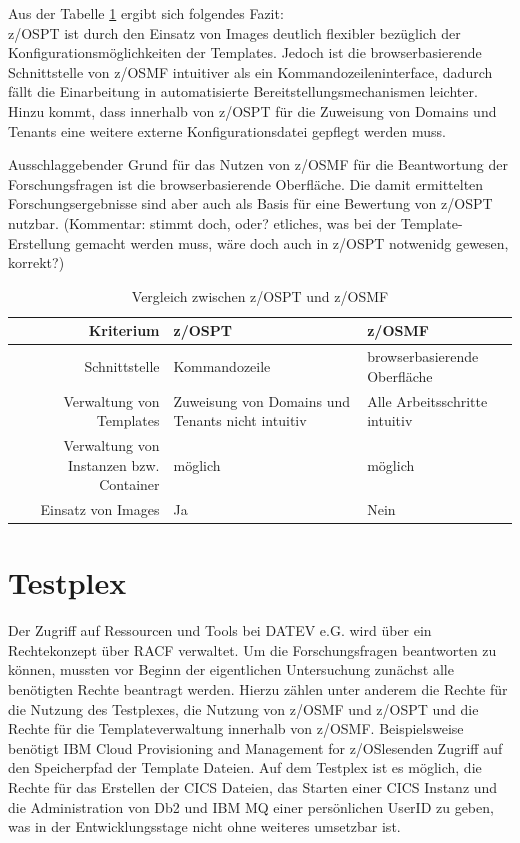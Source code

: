 Aus der Tabelle \ref{tab:vglzosptzosmf} ergibt sich folgendes Fazit:\\
z/OSPT ist durch den Einsatz von Images deutlich flexibler bezüglich der Konfigurationsmöglichkeiten der Templates.
Jedoch ist die browserbasierende Schnittstelle von z/OSMF intuitiver als ein Kommandozeileninterface, dadurch fällt die Einarbeitung in automatisierte Bereitstellungsmechanismen leichter.
Hinzu kommt, dass innerhalb von z/OSPT für die Zuweisung von Domains und Tenants eine weitere externe Konfigurationsdatei gepflegt werden muss.

Ausschlaggebender Grund für das Nutzen von z/OSMF für die Beantwortung der Forschungsfragen ist die browserbasierende Oberfläche.
Die damit ermittelten Forschungsergebnisse sind aber auch als Basis für eine Bewertung von z/OSPT nutzbar. (Kommentar: stimmt doch, oder? etliches, was bei der Template-Erstellung gemacht werden muss, wäre doch auch in z/OSPT notwenidg gewesen, korrekt?)
\begin{table}
\centering
\begin{tabularx}{\textwidth}{r|X|X}
Kriterium & z/OSPT & z/OSMF\\
\hline
Schnittstelle & Kommandozeile & browserbasierende Oberfläche\\
\hline
Verwaltung von Templates & Zuweisung von Domains und Tenants nicht intuitiv & Alle Arbeitsschritte intuitiv\\
\hline
Verwaltung von Instanzen bzw. Container &  möglich & möglich\\
\hline
Einsatz von Images & Ja & Nein\\
\end{tabularx}
\caption{Vergleich zwischen z/OSPT und z/OSMF}
\label{tab:vglzosptzosmf}
\end{table}

\section{Testplex}
Der Zugriff auf Ressourcen und Tools bei DATEV e.G. wird über ein Rechtekonzept über RACF verwaltet. 
Um die Forschungsfragen beantworten zu können, mussten vor Beginn der eigentlichen Untersuchung zunächst alle benötigten Rechte beantragt werden.
Hierzu zählen unter anderem die Rechte für die Nutzung des Testplexes, die Nutzung von z/OSMF und z/OSPT und die Rechte für die Templateverwaltung innerhalb von z/OSMF. 
Beispielsweise benötigt \glqq IBM Cloud Provisioning and Management for z/OS\grqq  lesenden Zugriff auf den Speicherpfad der Template Dateien.
Auf dem Testplex ist es  möglich, die Rechte für das Erstellen der CICS Dateien, das Starten einer CICS Instanz und die Administration von Db2 und IBM MQ einer persönlichen UserID zu geben, was in der Entwicklungsstage nicht ohne weiteres umsetzbar ist. 

